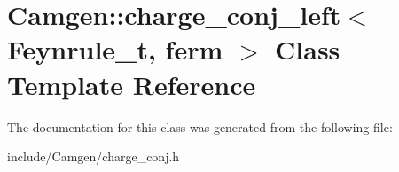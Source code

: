 \hypertarget{a00063}{}\section{Camgen\+:\+:charge\+\_\+conj\+\_\+left$<$ Feynrule\+\_\+t, ferm $>$ Class Template Reference}
\label{a00063}


The documentation for this class was generated from the following file\+:\begin{DoxyCompactItemize}
\item 
include/\+Camgen/charge\+\_\+conj.\+h\end{DoxyCompactItemize}
